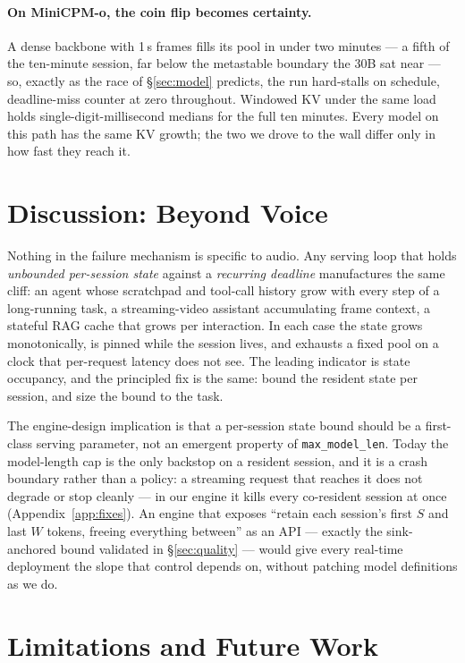 \paragraph{On MiniCPM-o, the coin flip becomes certainty.} A dense backbone with 1\,s frames fills its
pool in under two minutes --- a fifth of the ten-minute session, far below the metastable boundary the
30B sat near --- so, exactly as the race of \S\ref{sec:model} predicts, the run hard-stalls on
schedule, deadline-miss counter at zero throughout. Windowed KV under the same load holds
single-digit-millisecond medians for the full ten minutes. Every model on this path has the same KV
growth; the two we drove to the wall differ only in how fast they reach it.

\section{Discussion: Beyond Voice}
\label{sec:discussion}

Nothing in the failure mechanism is specific to audio. Any serving loop that holds \emph{unbounded
per-session state} against a \emph{recurring deadline} manufactures the same cliff: an agent whose
scratchpad and tool-call history grow with every step of a long-running task, a streaming-video
assistant accumulating frame context, a stateful RAG cache that grows per interaction. In each case the
state grows monotonically, is pinned while the session lives, and exhausts a fixed pool on a clock that
per-request latency does not see. The leading indicator is state occupancy, and the principled fix is
the same: bound the resident state per session, and size the bound to the task.

The engine-design implication is that a per-session state bound should be a first-class serving
parameter, not an emergent property of \texttt{max\_model\_len}. Today the model-length cap is the only
backstop on a resident session, and it is a crash boundary rather than a policy: a streaming request that
reaches it does not degrade or stop cleanly --- in our engine it kills every co-resident session at once
(Appendix~\ref{app:fixes}). An engine that exposes ``retain each session's first $S$ and last $W$
tokens, freeing everything between'' as an API --- exactly the sink-anchored bound validated in
\S\ref{sec:quality} --- would give every real-time deployment the slope that control depends on,
without patching model definitions as we do.

\section{Limitations and Future Work}
\label{sec:limits}

